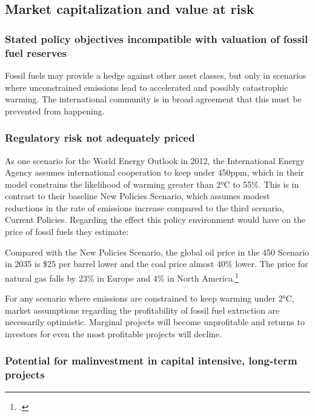 \begin{samepage}
	\subsection {Market capitalization and value at risk}

\subsubsection {Stated policy objectives incompatible with valuation of fossil fuel reserves}

Fossil fuels may provide a hedge against other asset classes, but only in scenarios where unconstrained emissions lead to accelerated and possibly catastrophic warming. 
The international community is in broad agreement that this must be prevented from happening.
\end{samepage}



\subsubsection {Regulatory risk not adequately priced} 



As one scenario for the World Energy Outlook in 2012, the International Energy Agency assumes international cooperation to keep  under 450ppm, which in their model constrains the likelihood of warming greater than 2°C to 55\%. 
This is in contrast to their baseline New Policies Scenario, which assumes modest reductions in the rate of emissions increase compared to the third scenario, Current Policies. 
Regarding the effect this policy environment would have on the price of fossil fuels they estimate:
\begin{slquote}Compared with the New Policies Scenario, the global oil price in the 450 Scenario in 2035 is \$25 per barrel lower and the coal price almost 40\% lower. The price for natural gas falls by 23\% in Europe and 4\% in North America.\footcite[][p. 257]{IEA2012}\end{slquote}



For any scenario where emissions are constrained to keep warming under 2°C, market assumptions regarding the profitability of fossil fuel extraction are necessarily optimistic. 
Marginal projects will become unprofitable and returns to investors for even the most profitable projects will decline. 


\subsubsection {Potential for malinvestment in capital intensive, long-term projects}



